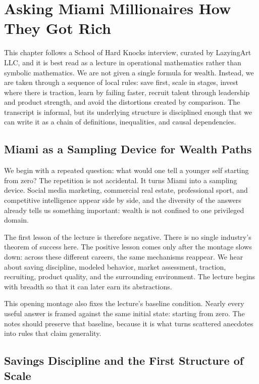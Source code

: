 \chapter{Asking Miami Millionaires How They Got Rich}

This chapter follows a School of Hard Knocks interview, curated by LazyingArt LLC, and it is best read as a lecture in operational mathematics rather than symbolic mathematics. We are not given a single formula for wealth. Instead, we are taken through a sequence of local rules: save first, scale in stages, invest where there is traction, learn by failing faster, recruit talent through leadership and product strength, and avoid the distortions created by comparison. The transcript is informal, but its underlying structure is disciplined enough that we can write it as a chain of definitions, inequalities, and causal dependencies.

\section{Miami as a Sampling Device for Wealth Paths}

We begin with a repeated question: what would one tell a younger self starting from zero? The repetition is not accidental. It turns Miami into a sampling device. Social media marketing, commercial real estate, professional sport, and competitive intelligence appear side by side, and the diversity of the answers already tells us something important: wealth is not confined to one privileged domain.

The first lesson of the lecture is therefore negative. There is no single industry's theorem of success here. The positive lesson comes only after the montage slows down: across these different careers, the same mechanisms reappear. We hear about saving discipline, modeled behavior, market assessment, traction, recruiting, product quality, and the surrounding environment. The lecture begins with breadth so that it can later earn its abstractions.

This opening montage also fixes the lecture's baseline condition. Nearly every useful answer is framed against the same initial state: starting from zero. The notes should preserve that baseline, because it is what turns scattered anecdotes into rules that claim generality.

\section{Savings Discipline and the First Structure of Scale}

